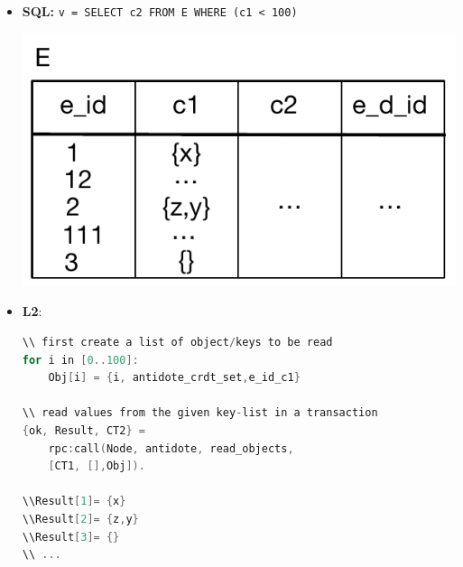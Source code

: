 \documentclass[12pt]{article}
\begin{document}
\begin{itemize}
\item {\bf SQL: } \hspace{5mm}\lstinline[basicstyle=\ttfamily]{v = SELECT c2 FROM E WHERE (c1 < 100)}
\\ 
\begin{center}
\includegraphics[scale=0.55]{range_ex.pdf}
\end{center}

\item {\bf L2}:
\begin{lstlisting}[language=C,basicstyle=\small,backgroundcolor =
\color{lightgray}]
\\ first create a list of object/keys to be read
for i in [0..100]:
	Obj[i] = {i, antidote_crdt_set,e_id_c1}

\\ read values from the given key-list in a transaction
{ok, Result, CT2} = 
	rpc:call(Node, antidote, read_objects,
	[CT1, [],Obj]).

\\Result[1]= {x}
\\Result[2]= {z,y}
\\Result[3]= {}
\\ ...
\end{lstlisting}

\end{itemize}






















%
%
\end{document}
